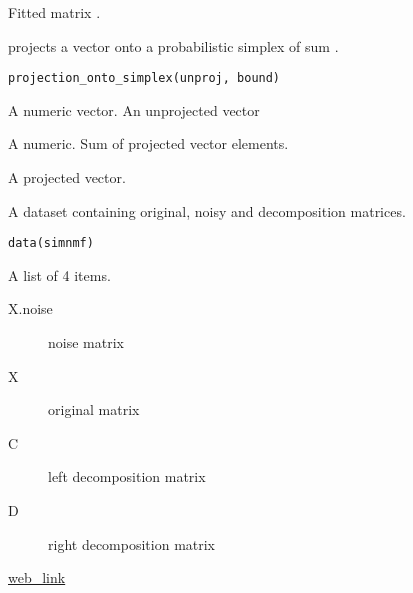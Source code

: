 \documentclass[letterpaper]{book}
\begin{document}
%
\begin{Value}
Fitted matrix .
\end{Value}
%
\begin{Description}\relax
{} projects a vector  onto a probabilistic simplex of sum .
\end{Description}
%
\begin{Usage}
\begin{verbatim}
projection_onto_simplex(unproj, bound)
\end{verbatim}
\end{Usage}
%
\begin{Arguments}
\begin{ldescription}
\item[\code{unproj}] A numeric vector. An unprojected vector

\item[\code{bound}] A numeric. Sum of projected vector elements.
\end{ldescription}
\end{Arguments}
%
\begin{Value}
A projected vector.
\end{Value}
%
\begin{Description}\relax
A dataset containing original, noisy and decomposition matrices.
\end{Description}
%
\begin{Usage}
\begin{verbatim}
data(simnmf)
\end{verbatim}
\end{Usage}
%
\begin{Format}
A list of 4 items.
\begin{description}

\item[X.noise] noise matrix
\item[X] original matrix
\item[C] left decomposition matrix
\item[D] right decomposition matrix

\end{description}

\end{Format}
%
\begin{Source}\relax
\url{web_link}
\end{Source}
\end{document}
